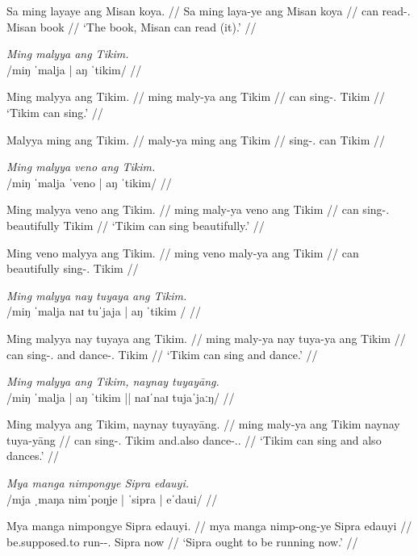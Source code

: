 \documentclass[12pt,a4paper]{scrartcl}
\newcommand{\TsgM}{{\Tsg}.{\M}}
\newcommand{\TsgF}{{\Tsg}.{\F}}
\begin{document}
\gla Sa ming layaye ang Misan koya. //
\glb Sa ming laya-ye ang Misan koya //
\glc \PatT{} can read-\TsgF{} \Aarg{} Misan book //
\glft `The book, Misan can read (it).' //
\endgl\xe

\pex
\a\begingl
\glpreamble \textit{Ming malyya ang Tikim.} \\
	/miŋ ˈmalja | aŋ ˈtikim/ //

\gla Ming malyya ang Tikim. //
\glb ming maly-ya ang Tikim //
\glc can sing-\TsgM{} \Aarg{} Tikim //
\glft `Tikim can sing.' //
\endgl

\a\ljudge*\begingl
\gla Malyya ming ang Tikim. //
\glb maly-ya ming ang Tikim //
\glc sing-\TsgM{} can \Aarg{} Tikim //
\endgl
\xe

\pex
\a\begingl
\glpreamble \textit{Ming malyya veno ang Tikim.} \\
	/miŋ ˈmalja ˈveno | aŋ ˈtikim/ //

\gla Ming malyya veno ang Tikim. //
\glb ming maly-ya veno ang Tikim //
\glc can sing-\TsgM{} beautifully \Aarg{} Tikim //
\glft `Tikim can sing beautifully.' //
\endgl

\a\ljudge*\begingl
\gla Ming veno malyya ang Tikim. //
\glb ming veno maly-ya ang Tikim //
\glc can beautifully sing-\TsgM{} \Aarg{} Tikim //
\endgl
\xe

\ex\begingl
\glpreamble \textit{Ming malyya nay tuyaya ang Tikim.} \\
	/miŋ ˈmalja naɪ tuˈjaja | aŋ ˈtikim / //

\gla Ming malyya nay tuyaya ang Tikim. //
\glb ming maly-ya nay tuya-ya ang Tikim //
\glc can sing-\TsgM{} and dance-\TsgM{} \Aarg{} Tikim //
\glft `Tikim can sing and dance.' //
\endgl\xe

\ex\begingl
\glpreamble \textit{Ming malyya ang Tikim, naynay tuyayāng.} \\
	/miŋ ˈmalja | aŋ ˈtikim || naɪˈnaɪ tujaˈjaːŋ/ //

\gla Ming malyya ang Tikim, naynay tuyayāng. //
\glb ming maly-ya ang Tikim naynay tuya-yāng //
\glc can sing-\TsgM{} \Aarg{} Tikim and.also dance-\TsgM{}.\Aarg{} //
\glft `Tikim can sing and also dances.' //
\endgl\xe

\ex\begingl
\glpreamble \textit{Mya manga nimpongye Sipra edauyi.} \\
	/mja ˌmaŋa nimˈpoŋje | ˈsipra | eˈdaui/ //

\gla Mya manga nimpongye Sipra edauyi. //
\glb mya manga nimp-ong-ye Sipra edauyi //
\glc be.supposed.to \Prog{} run-\Irr{}-\TsgF{} Sipra now //
\glft `Sipra ought to be running now.' //
\endgl\xe
\end{document}
